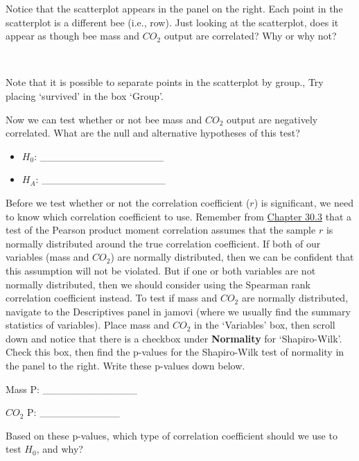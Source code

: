 \documentclass[
]{scrbook}
\begin{document}
Notice that the scatterplot appears in the panel on the right.
Each point in the scatterplot is a different bee (i.e., row).
Just looking at the scatterplot, does it appear as though bee mass and \(CO_2\) output are correlated?
Why or why not?

\begin{verbatim}


\end{verbatim}

Note that it is possible to separate points in the scatterplot by group.,
Try placing `survived' in the box `Group'.

Now we can test whether or not bee mass and \(CO_{2}\) output are negatively correlated.
What are the null and alternative hypotheses of this test?

\begin{itemize}
\item
  \(H_{0}\): \_\_\_\_\_\_\_\_\_\_\_\_\_\_\_\_\_
\item
  \(H_{A}\): \_\_\_\_\_\_\_\_\_\_\_\_\_\_\_\_\_
\end{itemize}

Before we test whether or not the correlation coefficient (\(r\)) is significant, we need to know which correlation coefficient to use.
Remember from \protect\hyperlink{correlation-hypothesis-testing}{Chapter 30.3} that a test of the Pearson product moment correlation assumes that the sample \(r\) is normally distributed around the true correlation coefficient.
If both of our variables (mass and \(CO_{2}\)) are normally distributed, then we can be confident that this assumption will not be violated.
But if one or both variables are not normally distributed, then we should consider using the Spearman rank correlation coefficient instead.
To test if mass and \(CO_{2}\) are normally distributed, navigate to the Descriptives panel in jamovi (where we usually find the summary statistics of variables).
Place mass and \(CO_{2}\) in the `Variables' box, then scroll down and notice that there is a checkbox under \textbf{Normality} for `Shapiro-Wilk'.
Check this box, then find the p-values for the Shapiro-Wilk test of normality in the panel to the right.
Write these p-values down below.

Mass P: \_\_\_\_\_\_\_\_\_\_\_\_\_

\(CO_{2}\) P: \_\_\_\_\_\_\_\_\_\_\_

Based on these p-values, which type of correlation coefficient should we use to test \(H_{0}\), and why?
\end{document}
